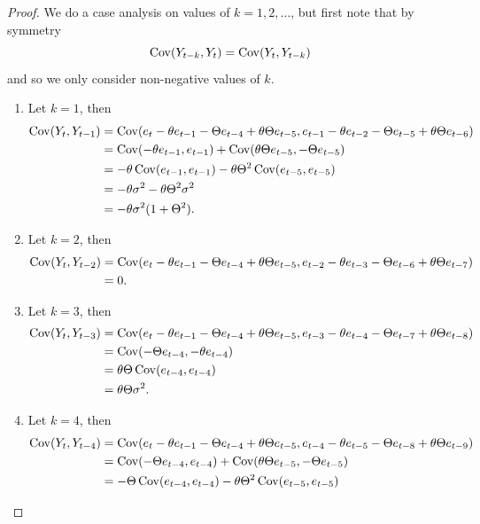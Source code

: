 \documentclass[
]{article}
\begin{document}
\begin{proof}
We do a case analysis on values of $k=1,2,\ldots$, but first note that by symmetry
$$
  \operatorname{Cov}(Y_{t-k},Y_t) = \operatorname{Cov}(Y_t,Y_{t-k})
$$
and so we only consider non-negative values of $k$.

\begin{enumerate}
\item Let $k=1$, then
\begin{align*}
  \operatorname{Cov}(Y_t,Y_{t-1})
    &= \operatorname{Cov}(e_t - \theta e_{t-1} - \Theta e_{t-4} + \theta\Theta e_{t-5},
            e_{t-1} - \theta e_{t-2} - \Theta e_{t-5} + \theta\Theta e_{t-6})\\
    &= \operatorname{Cov}(-\theta e_{t-1},e_{t-1}) + \operatorname{Cov}(\theta\Theta e_{t-5},-\Theta e_{t-5})\\
    &= -\theta \operatorname{Cov}(e_{t-1},e_{t-1}) - \theta\Theta^2 \operatorname{Cov}(e_{t-5},e_{t-5})\\
    &= -\theta \sigma^2 - \theta\Theta^2 \sigma^2\\
    &= -\theta \sigma^2(1+\Theta^2).
\end{align*}
\item Let $k=2$, then
\begin{align*}
  \operatorname{Cov}(Y_t,Y_{t-2})
    &= \operatorname{Cov}(e_t - \theta e_{t-1} - \Theta e_{t-4} + \theta\Theta e_{t-5},
            e_{t-2} - \theta e_{t-3} - \Theta e_{t-6} + \theta\Theta e_{t-7})\\
    &= 0.
\end{align*}
\item Let $k=3$, then
\begin{align*}
  \operatorname{Cov}(Y_t,Y_{t-3})
    &= \operatorname{Cov}(e_t - \theta e_{t-1} - \Theta e_{t-4} + \theta\Theta e_{t-5},
            e_{t-3} - \theta e_{t-4} - \Theta e_{t-7} + \theta\Theta e_{t-8})\\
    &= \operatorname{Cov}(-\Theta e_{t-4},-\theta e_{t-4})\\
    &= \theta\Theta \operatorname{Cov}(e_{t-4},e_{t-4})\\
    &= \theta\Theta \sigma^2.
\end{align*}
\item Let $k=4$, then
\begin{align*}
  \cov(Y_t,Y_{t-4})
    &= \cov(e_t - \theta e_{t-1} - \Theta e_{t-4} + \theta\Theta e_{t-5},
            e_{t-4} - \theta e_{t-5} - \Theta e_{t-8} + \theta\Theta e_{t-9})\\
    &= \cov(-\Theta e_{t-4},e_{t-4}) + \cov(\theta\Theta e_{t-5},-\Theta e_{t-5})\\
    &= -\Theta \cov(e_{t-4},e_{t-4}) - \theta\Theta^2 \cov(e_{t-5},e_{t-5})\\

\end{align*}
\end{enumerate}
\end{proof}
\end{document}
